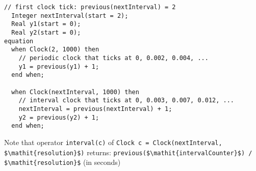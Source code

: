 \begin{operatordefinition*}[Clock]
\begin{semantics}
\begin{example}
\begin{lstlisting}[language=modelica]
  // first clock tick: previous(nextInterval) = 2
  Integer nextInterval(start = 2);
  Real y1(start = 0);
  Real y2(start = 0);
equation
  when Clock(2, 1000) then
    // periodic clock that ticks at 0, 0.002, 0.004, ...
    y1 = previous(y1) + 1;
  end when;

  when Clock(nextInterval, 1000) then
    // interval clock that ticks at 0, 0.003, 0.007, 0.012, ...
    nextInterval = previous(nextInterval) + 1;
    y2 = previous(y2) + 1;
  end when;
\end{lstlisting}
\end{example}

Note that operator \lstinline!interval(c)! of \lstinline!Clock c = Clock(nextInterval, $\mathit{resolution}$)! returns:\newline
\lstinline!previous($\mathit{intervalCounter}$) / $\mathit{resolution}$! (in seconds)
\end{semantics}
\end{operatordefinition*}

